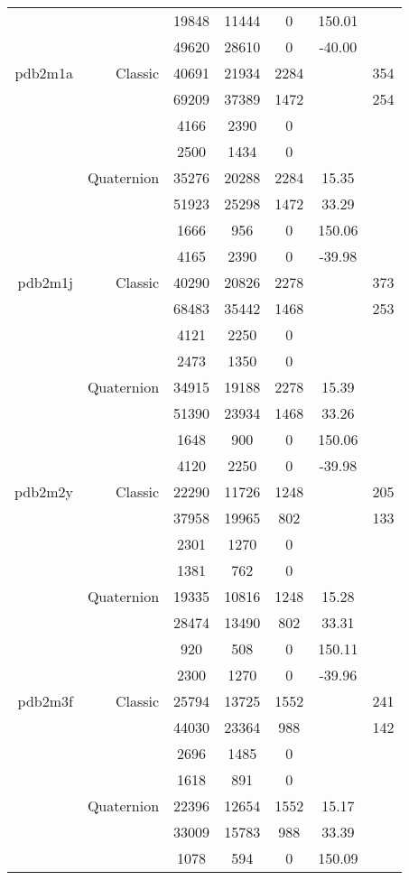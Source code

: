 \begin{xltabular}{\textwidth}{r|rcccSc}
& & 19848 & 11444 & 0 & 150.01 & \\
& & 49620 & 28610 & 0 & -40.00 & \\ \addlinespace
pdb2m1a & Classic & 40691 & 21934 & 2284 & & 354 \\
& & 69209 & 37389 & 1472 & & 254 \\
& & 4166 & 2390 & 0 & & \\
& & 2500 & 1434 & 0 & & \\
& Quaternion & 35276 & 20288 & 2284 & 15.35 & \\
& & 51923 & 25298 & 1472 & 33.29 & \\
& & 1666 & 956 & 0 & 150.06 & \\
& & 4165 & 2390 & 0 & -39.98 & \\ \addlinespace
pdb2m1j & Classic & 40290 & 20826 & 2278 & & 373 \\
& & 68483 & 35442 & 1468 & & 253 \\
& & 4121 & 2250 & 0 & & \\
& & 2473 & 1350 & 0 & & \\
& Quaternion & 34915 & 19188 & 2278 & 15.39 & \\
& & 51390 & 23934 & 1468 & 33.26 & \\
& & 1648 & 900 & 0 & 150.06 & \\
& & 4120 & 2250 & 0 & -39.98 & \\ \addlinespace
pdb2m2y & Classic & 22290 & 11726 & 1248 & & 205 \\
& & 37958 & 19965 & 802 & & 133 \\
& & 2301 & 1270 & 0 & & \\
& & 1381 & 762 & 0 & & \\
& Quaternion & 19335 & 10816 & 1248 & 15.28 & \\
& & 28474 & 13490 & 802 & 33.31 & \\
& & 920 & 508 & 0 & 150.11 & \\
& & 2300 & 1270 & 0 & -39.96 & \\ \addlinespace
pdb2m3f & Classic & 25794 & 13725 & 1552 & & 241 \\
& & 44030 & 23364 & 988 & & 142 \\
& & 2696 & 1485 & 0 & & \\
& & 1618 & 891 & 0 & & \\
& Quaternion & 22396 & 12654 & 1552 & 15.17 & \\
& & 33009 & 15783 & 988 & 33.39 & \\
& & 1078 & 594 & 0 & 150.09 & \\

\end{xltabular}
